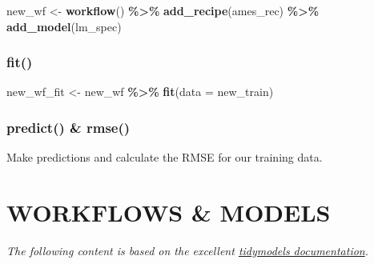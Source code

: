 \documentclass[
]{book}
\newenvironment{Shaded}{\begin{snugshade}}{\end{snugshade}}
\newcommand{\DataTypeTok}[1]{\textcolor[rgb]{0.13,0.29,0.53}{#1}}
\newcommand{\KeywordTok}[1]{\textcolor[rgb]{0.13,0.29,0.53}{\textbf{#1}}}
\newcommand{\NormalTok}[1]{#1}
\newcommand{\OperatorTok}[1]{\textcolor[rgb]{0.81,0.36,0.00}{\textbf{#1}}}
\newcommand{\StringTok}[1]{\textcolor[rgb]{0.31,0.60,0.02}{#1}}
\begin{document}
\begin{Shaded}
\begin{Highlighting}[]
\NormalTok{new\_wf \textless{}{-}}
\StringTok{  }\KeywordTok{workflow}\NormalTok{() }\OperatorTok{\%\textgreater{}\%}
\StringTok{  }\KeywordTok{add\_recipe}\NormalTok{(ames\_rec) }\OperatorTok{\%\textgreater{}\%}
\StringTok{  }\KeywordTok{add\_model}\NormalTok{(lm\_spec)}
\end{Highlighting}
\end{Shaded}

\hypertarget{fit}{%
\section{fit()}\label{fit}}

\begin{Shaded}
\begin{Highlighting}[]
\NormalTok{new\_wf\_fit \textless{}{-}}
\StringTok{  }\NormalTok{new\_wf }\OperatorTok{\%\textgreater{}\%}
\StringTok{  }\KeywordTok{fit}\NormalTok{(}\DataTypeTok{data =}\NormalTok{ new\_train)}
\end{Highlighting}
\end{Shaded}

\hypertarget{predict-rmse}{%
\section{predict() \& rmse()}\label{predict-rmse}}

Make predictions and calculate the RMSE for our training data.

\begin{Shaded}
\end{Shaded}

\hypertarget{part-workflows-models}{%
\part{WORKFLOWS \& MODELS}\label{part-workflows-models}}

\emph{The following content is based on the excellent \href{https://www.tidymodels.org/start/recipes/}{tidymodels documentation}.}
\end{document}
